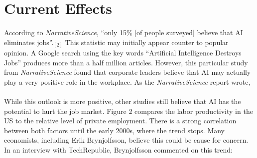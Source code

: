 \documentclass{article}
\begin{document}
  \section{Current Effects}
    \paragraph{}
      According to \textit{NarrativeScience}, ``only 15\% [of people surveyed]
      believe that AI eliminates jobs''.$_{[2]}$ This statistic may initially
      appear counter to popular opinion. A Google search using the key words
      ``Artificial Intelligence Destroys Jobs'' produces more than a half million
      articles. However, this particular study from \textit{NarrativeScience}
      found that corporate leaders believe that AI may actually play a very
      positive role in the workplace. As the \textit{NarrativeScience} report
      wrote,

      \begin{center}
      \end{center}

    \paragraph{}
      While this outlook is more positive, other studies still believe that AI has
      the potential to hurt the job market. Figure 2 compares
      the labor productivity in the US to the relative
      level of private employment. There is a strong correlation between both factors
      until the early 2000s, where the trend stops. Many economists, including
      Erik Brynjolfsson, believe this could be cause for concern.
      In an interview with TechRepublic, Brynjolfsson
      commented on this trend:

      \begin{center}
      \end{center}
\end{document}
